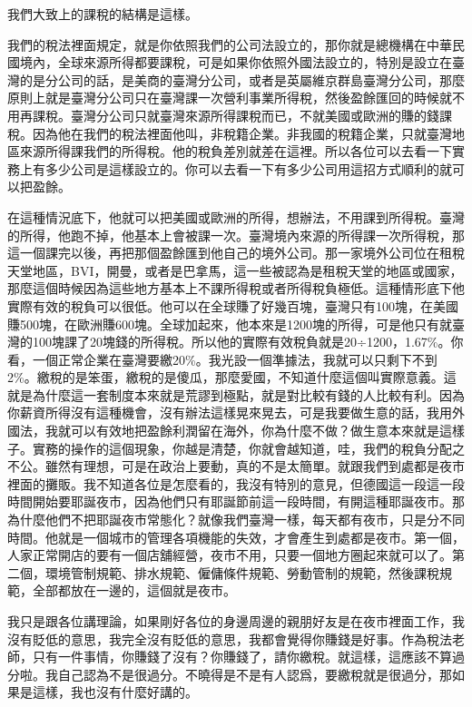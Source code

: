 \documentclass[]{ctexbook}
\begin{document}
我們大致上的課稅的結構是這樣。

我們的稅法裡面規定，就是你依照我們的公司法設立的，那你就是總機構在中華民國境內，全球來源所得都要課稅，可是如果你依照外國法設立的，特別是設立在臺灣的是分公司的話，是美商的臺灣分公司，或者是英屬維京群島臺灣分公司，那麼原則上就是臺灣分公司只在臺灣課一次營利事業所得稅，然後盈餘匯回的時候就不用再課稅。臺灣分公司只就臺灣來源所得課稅而已，不就美國或歐洲的賺的錢課稅。因為他在我們的稅法裡面他叫，非稅籍企業。非我國的稅籍企業，只就臺灣地區來源所得課我們的所得稅。他的稅負差別就差在這裡。所以各位可以去看一下實務上有多少公司是這樣設立的。你可以去看一下有多少公司用這招方式順利的就可以把盈餘。

在這種情況底下，他就可以把美國或歐洲的所得，想辦法，不用課到所得稅。臺灣的所得，他跑不掉，他基本上會被課一次。臺灣境內來源的所得課一次所得稅，那這一個課完以後，再把那個盈餘匯到他自己的境外公司。那一家境外公司位在租稅天堂地區，BVI，開曼，或者是巴拿馬，這一些被認為是租稅天堂的地區或國家，那麼這個時候因為這些地方基本上不課所得稅或者所得稅負極低。這種情形底下他實際有效的稅負可以很低。他可以在全球賺了好幾百塊，臺灣只有100塊，在美國賺500塊，在歐洲賺600塊。全球加起來，他本來是1200塊的所得，可是他只有就臺灣的100塊課了20塊錢的所得稅。所以他的實際有效稅負就是20÷1200，1.67\%。你看，一個正常企業在臺灣要繳20\%。我光設一個準據法，我就可以只剩下不到2\%。繳稅的是笨蛋，繳稅的是傻瓜，那麼愛國，不知道什麼這個叫實際意義。這就是為什麼這一套制度本來就是荒謬到極點，就是對比較有錢的人比較有利。因為你薪資所得沒有這種機會，沒有辦法這樣晃來晃去，可是我要做生意的話，我用外國法，我就可以有效地把盈餘利潤留在海外，你為什麼不做？做生意本來就是這樣子。實務的操作的這個現象，你越是清楚，你就會越知道，哇，我們的稅負分配之不公。雖然有理想，可是在政治上要動，真的不是太簡單。就跟我們到處都是夜市裡面的攤販。我不知道各位是怎麼看的，我沒有特別的意見，但德國這一段這一段時間開始要耶誕夜市，因為他們只有耶誕節前這一段時間，有開這種耶誕夜市。那為什麼他們不把耶誕夜市常態化？就像我們臺灣一樣，每天都有夜市，只是分不同時間。他就是一個城市的管理各項機能的失效，才會產生到處都是夜市。第一個，人家正常開店的要有一個店舖經營，夜市不用，只要一個地方圈起來就可以了。第二個，環境管制規範、排水規範、僱傭條件規範、勞動管制的規範，然後課稅規範，全部都放在一邊的，這個就是夜市。

我只是跟各位講理論，如果剛好各位的身邊周邊的親朋好友是在夜市裡面工作，我沒有貶低的意思，我完全沒有貶低的意思，我都會覺得你賺錢是好事。作為稅法老師，只有一件事情，你賺錢了沒有？你賺錢了，請你繳稅。就這樣，這應該不算過分啦。我自己認為不是很過分。不曉得是不是有人認爲，要繳稅就是很過分，那如果是這樣，我也沒有什麼好講的。
\end{document}
